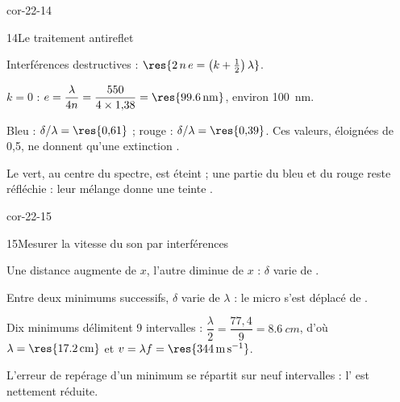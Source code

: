 \begin{blocLivre}{cor-22-14}
\begin{corrige}{14}{Le traitement antireflet}
\begin{questions}
\item Interférences destructives : $\res{2\,n\,e=\left(k+\frac12\right)\lambda}$.
\item $k=0$ : $e=\dfrac{\lambda}{4n}=\dfrac{550}{4\times1{,}38}=\res{\qty{99,6}{nm}}$, environ \qty{100}{nm}.
\item Bleu : $\delta/\lambda=\res{0{,}61}$ ; rouge : $\delta/\lambda=\res{0{,}39}$. Ces valeurs, éloignées de 0,5, ne donnent qu'une
extinction .
\item Le vert, au centre du spectre, est éteint ; une partie du bleu et du rouge reste réfléchie : leur mélange donne
une teinte .
\end{questions}
\end{corrige}
\end{blocLivre}
\begin{blocLivre}{cor-22-15}
\begin{corrige}{15}{Mesurer la vitesse du son par interférences}
\begin{questions}
\item Une distance augmente de $x$, l'autre diminue de $x$ : $\delta$ varie de .
\item Entre deux minimums successifs, $\delta$ varie de $\lambda$ : le micro s'est déplacé de .
\item Dix minimums délimitent 9 intervalles : $\dfrac{\lambda}{2}=\dfrac{77{,}4}{9}=\qty{8,6}{cm}$, d'où $\lambda=\res{\qty{17,2}{cm}}$ et
$v=\lambda f=\res{\qty{344}{m.s^{-1}}}$.
\item L'erreur de repérage d'un minimum se répartit sur neuf intervalles : l' est
nettement réduite.
\end{questions}
\end{corrige}
\end{blocLivre}
